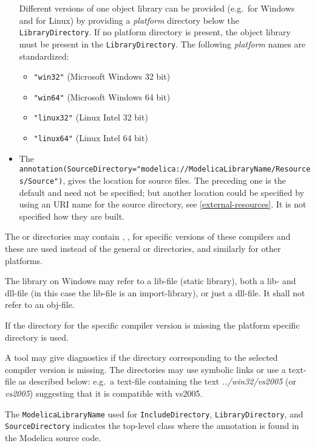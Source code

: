 \begin{itemize}
  Different versions of one object library can be provided (e.g.\ for Windows and for Linux) by providing a \emph{platform} directory below the \lstinline!LibraryDirectory!.
  If no platform directory is present, the object library must be present in the \lstinline!LibraryDirectory!.
  The following \emph{platform} names are standardized:
  \begin{itemize}
  \item
    \lstinline!"win32"! (Microsoft Windows 32 bit)
  \item
    \lstinline!"win64"! (Microsoft Windows 64 bit)
  \item
    \lstinline!"linux32"! (Linux Intel 32 bit)
  \item
    \lstinline!"linux64"! (Linux Intel 64 bit)
  \end{itemize}
\item
  The
  \lstinline!annotation(SourceDirectory="modelica://ModelicaLibraryName/Resources/Source")!, gives the location for source files.
  The preceding one is the default and need not be specified; but another location could be specified by using an URI name for the source directory, see \cref{external-resources}.
  It is not specified how they are built.
\end{itemize}

The  or  directories may contain , , 
for specific versions of these compilers and these are used instead of
the general  or  directories, and similarly for other
platforms.

The library on Windows may refer to a lib-file (static library), both a lib- and dll-file (in this case the lib-file is an import-library),
or just a dll-file. It shall not refer to an obj-file.

If the directory for the specific compiler version is missing the
platform specific directory is used.

\begin{nonnormative}
A tool may give diagnostics if the directory corresponding to the selected compiler version is missing.  The directories may use symbolic links or use
a text-file as described below: e.g.\ a text-file  containing the text \emph{../win32/vs2005} (or \emph{vs2005}) suggesting that it is
compatible with vs2005.
\end{nonnormative}

The \lstinline!ModelicaLibraryName! used for \lstinline!IncludeDirectory!, \lstinline!LibraryDirectory!, and \lstinline!SourceDirectory! indicates the top-level class where the annotation is found in the Modelica source code.

